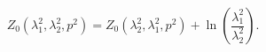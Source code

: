 \begin{equation}
Z_{0}(\lambda _{1}^{2},\lambda _{2}^{2},p^{2})=Z_{0}(\lambda
_{2}^{2},\lambda _{1}^{2},p^{2})+\ln \left( \frac{\lambda _{1}^{2}}{\lambda
_{2}^{2}}\right) .  \label{ref}
\end{equation}

